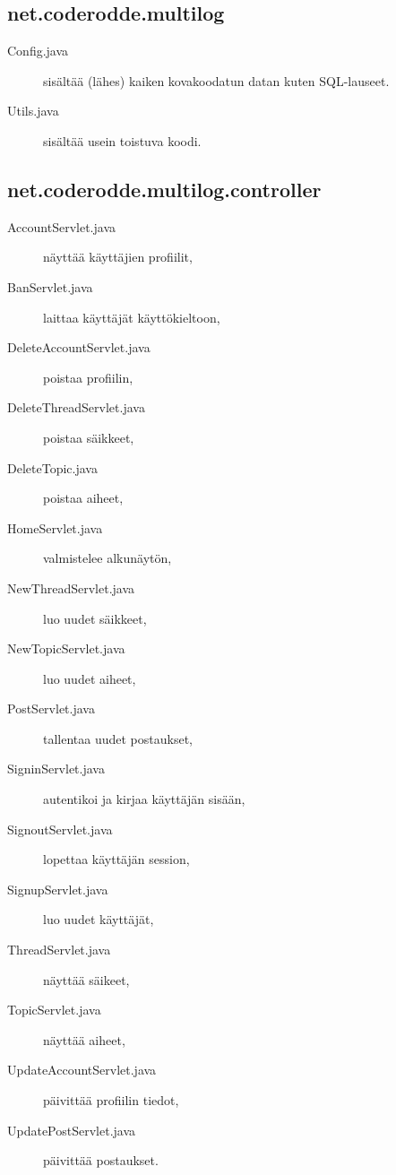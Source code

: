 \documentclass[10pt]{article}
\begin{document}
\subsection{net.coderodde.multilog}
\begin{description}
  \item[Config.java] sisältää (lähes) kaiken kovakoodatun datan kuten SQL-lauseet.
  \item[Utils.java] sisältää usein toistuva koodi.
\end{description}

\subsection{net.coderodde.multilog.controller}
\begin{description}
  \item[AccountServlet.java] näyttää käyttäjien profiilit,
  \item[BanServlet.java] laittaa käyttäjät käyttökieltoon,
  \item[DeleteAccountServlet.java] poistaa profiilin,
  \item[DeleteThreadServlet.java] poistaa säikkeet,
  \item[DeleteTopic.java] poistaa aiheet,
  \item[HomeServlet.java] valmistelee alkunäytön,
  \item[NewThreadServlet.java] luo uudet säikkeet,
  \item[NewTopicServlet.java] luo uudet aiheet,
  \item[PostServlet.java] tallentaa uudet postaukset,
  \item[SigninServlet.java] autentikoi ja kirjaa käyttäjän sisään,
  \item[SignoutServlet.java] lopettaa käyttäjän session,
  \item[SignupServlet.java] luo uudet käyttäjät,
  \item[ThreadServlet.java] näyttää säikeet,
  \item[TopicServlet.java] näyttää aiheet,
  \item[UpdateAccountServlet.java] päivittää profiilin tiedot,
  \item[UpdatePostServlet.java] päivittää postaukset.
\end{description}
\end{document}
